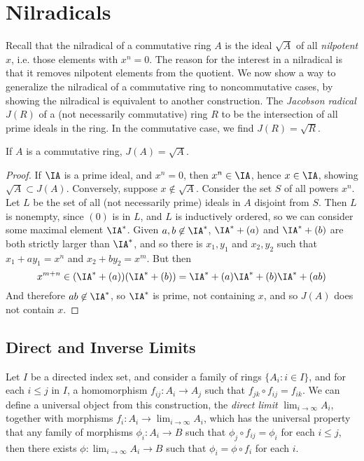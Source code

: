 \chapter{Nilradicals}

Recall that the nilradical of a commutative ring $A$ is the ideal $\sqrt{A}$ of all {\it nilpotent} $x$, i.e. those elements with $x^n = 0$. The reason for the interest in a nilradical is that it removes nilpotent elements from the quotient. We now show a way to generalize the nilradical of a commutative ring to noncommutative cases, by showing the nilradical is equivalent to another construction. The \emph{Jacobson radical} $J(R)$ of a (not necessarily commutative) ring $R$ to be the intersection of all prime ideals in the ring. In the commutative case, we find $J(R) = \sqrt{R}$.

\begin{theorem}
    If $A$ is a commutative ring, $J(A) = \sqrt{A}$.
\end{theorem}
\begin{proof}
    If $\IA$ is a prime ideal, and $x^n = 0$, then $x^n \in \IA$, hence $x \in \IA$, showing $\sqrt{A} \subset J(A)$. Conversely, suppose $x \not \in \sqrt{A}$. Consider the set $S$ of all powers $x^n$. Let $L$ be the set of all (not necessarily prime) ideals in $A$ disjoint from $S$. Then $L$ is nonempty, since $(0)$ is in $L$, and $L$ is inductively ordered, so we can consider some maximal element $\IA^*$. Given $a,b \not \in \IA^*$, $\IA^* + (a)$ and $\IA^* + (b)$ are both strictly larger than $\IA^*$, and so there is $x_1,y_1$ and $x_2,y_2$ such that $x_1 + ay_1 = x^n$ and $x_2 + by_2 = x^m$. But then
    \[ x^{m+n} \in (\IA^* + (a))(\IA^* + (b)) = \IA^* + (a) \IA^* + (b) \IA^* + (ab) \]
    And therefore $ab \not \in \IA^*$, so $\IA^*$ is prime, not containing $x$, and so $J(A)$ does not contain $x$.
\end{proof}

\section{Direct and Inverse Limits}

Let $I$ be a directed index set, and consider a family of rings $\{ A_i : i \in I \}$, and for each $i \leq j$ in $I$, a homomorphism $f_{ij}: A_i \to A_j$ such that $f_{jk} \circ f_{ij} = f_{ik}$. We can define a universal object from this construction, the \emph{direct limit} $\lim_{i \to \infty} A_i$, together with morphisms $f_i: A_i \to \lim_{i \to \infty} A_i$, which has the universal property that any family of morphisms $\phi_i: A_i \to B$ such that $\phi_j \circ f_{ij} = \phi_i$ for each $i \leq j$, then there exists $\phi: \lim_{i \to \infty} A_i \to B$ such that $\phi_i = \phi \circ f_i$ for each $i$.

